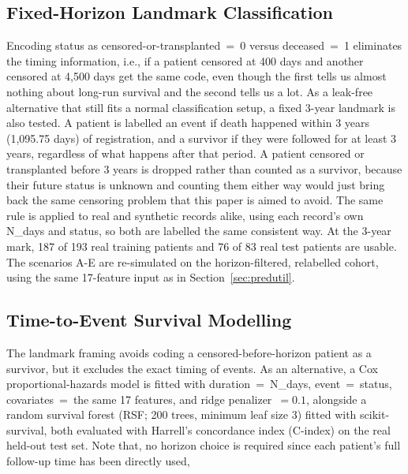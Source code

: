\subsection{Fixed-Horizon Landmark Classification}
\label{sec:landmark}

Encoding status as censored-or-transplanted~=~0 versus deceased~=~1 eliminates the timing information, i.e., if a patient censored at 400 days and another censored at 4{,}500 days get the same code, even though the first tells us almost nothing about long-run survival and the second tells us a lot. As a leak-free alternative that still fits a normal classification setup, a fixed 3-year landmark is also tested. A patient is labelled an event if death happened within 3 years (1,095.75 days) of registration, and a survivor if they were followed for at least 3 years, regardless of what happens after that period. A patient censored or transplanted before 3 years is dropped rather than counted as a survivor, because their future status is unknown and counting them either way would just bring back the same censoring problem that this paper is aimed to avoid. The same rule is applied to real and synthetic records alike, using each record's own N\_days and status, so both are labelled the same consistent way. At the 3-year mark, 187 of 193 real training patients and 76 of 83 real test patients are usable. The scenarios A-E are re-simulated on the horizon-filtered, relabelled cohort, using the same 17-feature input as in Section~\ref{sec:predutil}.

\subsection{Time-to-Event Survival Modelling}
\label{sec:survival}

The landmark framing avoids coding a censored-before-horizon patient as a survivor, but it excludes the exact timing of events. As an alternative, a Cox proportional-hazards model is fitted with duration~=~N\_days, event~=~status, covariates~=~the same 17 features, and ridge penalizer~$=0.1$, alongside a random survival forest (RSF; 200 trees, minimum leaf size 3) fitted with scikit-survival, both evaluated with Harrell's concordance index (C-index) on the real held-out test set. Note that, no horizon choice is required since each patient's full follow-up time has been directly used, 

